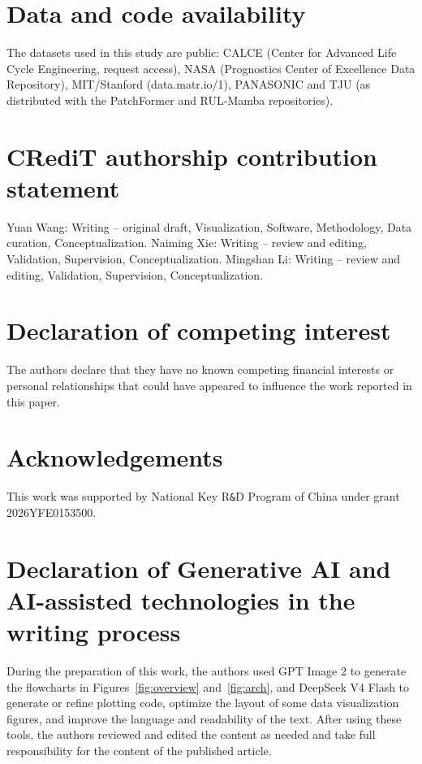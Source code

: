 \documentclass[final,5p,times,twocolumn]{elsarticle}
\begin{document}
\section*{Data and code availability}

The datasets used in this study are public: CALCE (Center for
Advanced Life Cycle Engineering, request access), NASA (Prognostics
Center of Excellence Data Repository), MIT/Stanford
(data.matr.io/1), PANASONIC and TJU (as distributed with the
PatchFormer and RUL-Mamba repositories). 

\section*{CRediT authorship contribution statement}

Yuan Wang: Writing -- original draft, Visualization, Software,
Methodology, Data curation, Conceptualization. Naiming Xie: Writing --
review and editing, Validation, Supervision, Conceptualization. Mingshan
Li: Writing -- review and editing, Validation, Supervision,
Conceptualization.

\section*{Declaration of competing interest}

The authors declare that they have no known competing financial
interests or personal relationships that could have appeared to
influence the work reported in this paper.

\section*{Acknowledgements}

This work was supported by National Key R\verb|&|D Program of China under grant 2026YFE0153500.

\section*{Declaration of Generative AI and AI-assisted technologies in the writing process}

During the preparation of this work, the authors used GPT Image 2 to
generate the flowcharts in Figures~\ref{fig:overview} and~\ref{fig:arch}, and
DeepSeek V4 Flash to generate or
refine plotting code, optimize the layout of some data visualization figures,
and improve the language and readability of the text. After using these
tools, the authors reviewed and edited the content as needed and take full
responsibility for the content of the published article.



\end{document}
